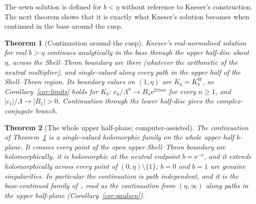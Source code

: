 \documentclass[11pt]{amsart}
\newtheorem{maintheorem}{Theorem}
\theoremstyle{definition}
\newcommand{\Kk}{K}
\newcommand{\eee}{\mathrm{e}}
\newcommand{\ii}{\mathrm{i}}
\begin{document}
The sewn solution is defined for $b<\eta$ without reference to Kneser's
construction.  The next theorem shows that it is exactly what Kneser's
solution becomes when continued in the base around the cusp.

\begin{maintheorem}[Continuation around the cusp]\label{mthm:F}
Kneser's real-normalised solution for real $b>\eta$ continues analytically in the
base through the upper half-disc about $\eta$, across the Shell--Thron boundary arc
there (whatever the arithmetic of the neutral multiplier), and single-valued
along every path in the upper half of the Shell--Thron region.  Its boundary
values on $(1,\eta)$ are $\Kk_b=\Kk^W_b$, so Corollary~\ref{cor:limits} holds for $\Kk_b$:
$c_n/\Lambda^n\to B_n\eee^{2\pi\ii na}$ for every $n\ge1$, and $|c_1|/\Lambda\to|B_1|>0$.  Continuation
through the lower half-disc gives the complex-conjugate branch.
\end{maintheorem}

\begin{maintheorem}[The whole upper half-plane; computer-assisted]\label{mthm:G}
The continuation of Theorem~\ref{mthm:F} is a single-valued holomorphic family on
the whole upper half $b$-plane.  It crosses every point of the open upper
Shell--Thron boundary arc holomorphically, it is holomorphic at the neutral
endpoint $b=\eee^{-\eee}$, and it extends holomorphically across every point of
$(0,\eta)\setminus\{1\}$; $b=0$ and $b=1$ are genuine singularities.  In particular the continuation
is path independent, and it is the base-continued family of~\cite{Paulsen2019}, read as the
continuation from $(\eta,\infty)$ along paths in the upper half-plane
(Corollary~\ref{cor:paulsen}).
\end{maintheorem}
\end{document}
